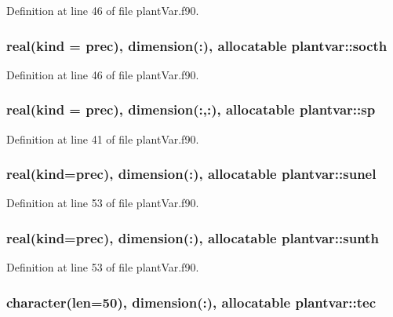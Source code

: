 Definition at line 46 of file plant\-Var.\-f90.

\hypertarget{classplantvar_a9cdc1767d27c7362b6c33bc24fbe79ed}{
\subsubsection[{socth}]{\setlength{\rightskip}{0pt plus 5cm}real(kind = prec), dimension(\-:), allocatable plantvar\-::socth}}\label{classplantvar_a9cdc1767d27c7362b6c33bc24fbe79ed}


Definition at line 46 of file plant\-Var.\-f90.

\hypertarget{classplantvar_a0ecfac9070622328232608ce808ede2b}{
\subsubsection[{sp}]{\setlength{\rightskip}{0pt plus 5cm}real(kind = prec), dimension(\-:,\-:), allocatable plantvar\-::sp}}\label{classplantvar_a0ecfac9070622328232608ce808ede2b}


Definition at line 41 of file plant\-Var.\-f90.

\hypertarget{classplantvar_ae2c75e1880b14179e8c96c8bd209f26d}{
\subsubsection[{sunel}]{\setlength{\rightskip}{0pt plus 5cm}real(kind=prec), dimension(\-:), allocatable plantvar\-::sunel}}\label{classplantvar_ae2c75e1880b14179e8c96c8bd209f26d}


Definition at line 53 of file plant\-Var.\-f90.

\hypertarget{classplantvar_a1de4d45e17d60dcfca28b6bd17e74e05}{
\subsubsection[{sunth}]{\setlength{\rightskip}{0pt plus 5cm}real(kind=prec), dimension(\-:), allocatable plantvar\-::sunth}}\label{classplantvar_a1de4d45e17d60dcfca28b6bd17e74e05}


Definition at line 53 of file plant\-Var.\-f90.

\hypertarget{classplantvar_a4de39d7f2e55534eeac1a570bf8d30ff}{
\subsubsection[{tec}]{\setlength{\rightskip}{0pt plus 5cm}character(len=50), dimension(\-:), allocatable plantvar\-::tec}}\label{classplantvar_a4de39d7f2e55534eeac1a570bf8d30ff}


